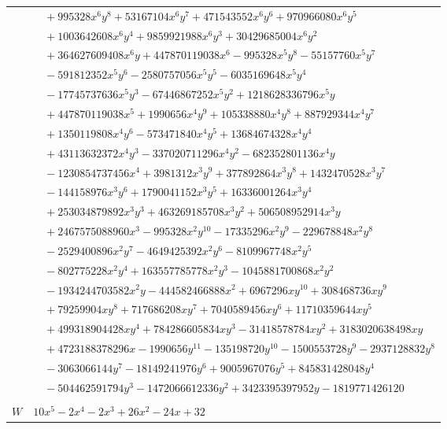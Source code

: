\documentclass[11pt]{article}
\begin{document}
\begin{longtable}{@{}ll@{}}
 & $\quad +995328x^{6}y^{8}+53167104x^{6}y^{7}+471543552x^{6}y^{6}+970966080x^{6}y^{5}$\\
 & $\quad +1003642608x^{6}y^{4}+9859921988x^{6}y^{3}+30429685004x^{6}y^{2}$\\
 & $\quad +364627609408x^{6}y+447870119038x^{6}-995328x^{5}y^{8}-55157760x^{5}y^{7}$\\
 & $\quad -591812352x^{5}y^{6}-2580757056x^{5}y^{5}-6035169648x^{5}y^{4}$\\
 & $\quad -17745737636x^{5}y^{3}-67446867252x^{5}y^{2}+1218628336796x^{5}y$\\
 & $\quad +447870119038x^{5}+1990656x^{4}y^{9}+105338880x^{4}y^{8}+887929344x^{4}y^{7}$\\
 & $\quad +1350119808x^{4}y^{6}-573471840x^{4}y^{5}+13684674328x^{4}y^{4}$\\
 & $\quad +43113632372x^{4}y^{3}-337020711296x^{4}y^{2}-682352801136x^{4}y$\\
 & $\quad -1230854737456x^{4}+3981312x^{3}y^{9}+377892864x^{3}y^{8}+1432470528x^{3}y^{7}$\\
 & $\quad -144158976x^{3}y^{6}+1790041152x^{3}y^{5}+16336001264x^{3}y^{4}$\\
 & $\quad +253034879892x^{3}y^{3}+463269185708x^{3}y^{2}+506508952914x^{3}y$\\
 & $\quad +2467575088960x^{3}-995328x^{2}y^{10}-17335296x^{2}y^{9}-229678848x^{2}y^{8}$\\
 & $\quad -2529400896x^{2}y^{7}-4649425392x^{2}y^{6}-8109967748x^{2}y^{5}$\\
 & $\quad -802775228x^{2}y^{4}+163557785778x^{2}y^{3}-1045881700868x^{2}y^{2}$\\
 & $\quad -1934244703582x^{2}y-444582466888x^{2}+6967296xy^{10}+308468736xy^{9}$\\
 & $\quad +79259904xy^{8}+717686208xy^{7}+7040589456xy^{6}+11710359644xy^{5}$\\
 & $\quad +499318904428xy^{4}+784286605834xy^{3}-31418578784xy^{2}+3183020638498xy$\\
 & $\quad +4723188378296x-1990656y^{11}-135198720y^{10}-1500553728y^{9}-2937128832y^{8}$\\
 & $\quad -3063066144y^{7}-18149241976y^{6}+9005967076y^{5}+845831428048y^{4}$\\
 & $\quad -504462591794y^{3}-1472066612336y^{2}+3423395397952y-1819771426120$\\
\addlinespace[3pt]
\multicolumn{2}{@{}l}{$i=34$, $m=8$, neighbours $41,3,5,6,8,16,18$}\\
$W$ & $10x^{5}-2x^{4}-2x^{3}+26x^{2}-24x+32$\\

\end{longtable}
\end{document}
